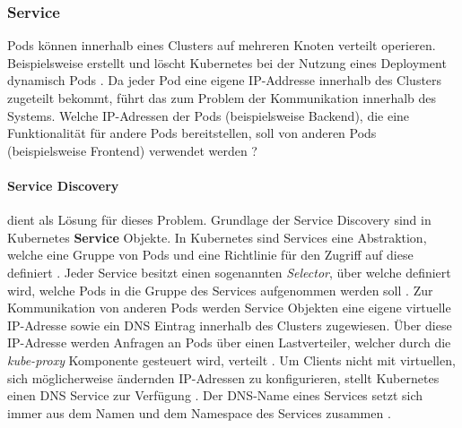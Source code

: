 \subsubsection{Service}
\label{subsec:kubernetes:service}
Pods können innerhalb eines Clusters auf mehreren Knoten verteilt operieren.
Beispielsweise erstellt und löscht Kubernetes bei der Nutzung eines Deployment dynamisch Pods \cite{kubernetesService}.
Da jeder Pod eine eigene IP-Addresse innerhalb des Clusters zugeteilt bekommt, führt das zum Problem der Kommunikation innerhalb des Systems.
Welche IP-Adressen der Pods (beispielsweise Backend),
die eine Funktionalität für andere Pods bereitstellen, soll von anderen Pods (beispielsweise Frontend) verwendet werden \cite{kubernetesService}?
\paragraph{Service Discovery}
dient als Lösung für dieses Problem.
Grundlage der Service Discovery sind in Kubernetes \textbf{Service} Objekte.
In Kubernetes sind Services eine Abstraktion, welche eine Gruppe von Pods und eine Richtlinie für den Zugriff auf diese definiert \cite{kubernetesService}.
Jeder Service besitzt einen sogenannten \emph{Selector}, über welche definiert wird, welche Pods in die Gruppe des Services aufgenommen werden soll \cite{Burns2019}.
Zur Kommunikation von anderen Pods werden Service Objekten eine eigene virtuelle IP-Adresse 
sowie ein DNS Eintrag innerhalb des Clusters zugewiesen.
Über diese IP-Adresse werden Anfragen an Pods über einen Lastverteiler, welcher durch die \emph{kube-proxy} Komponente gesteuert wird,
verteilt \cite{Burns2019}.
Um Clients nicht mit virtuellen, sich möglicherweise ändernden IP-Adressen zu konfigurieren, stellt Kubernetes einen DNS Service zur
Verfügung \cite{Burns2019}.
Der DNS-Name eines Services setzt sich immer aus dem Namen und dem Namespace des Services zusammen \cite{kubernetesService}.
